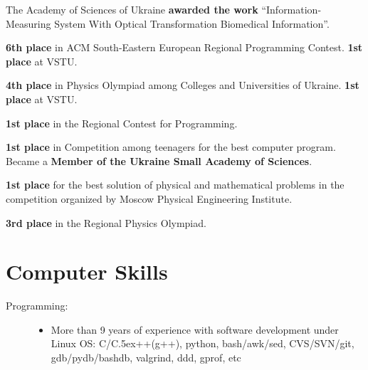 \documentclass[12pt,overlapped,line]{res}
\def\Cplusplus{{\rm C\raise.5ex\hbox{\small ++}}}
\newcommand{\mplace}[1]{\textbf{#1}}
\begin{document}
\begin{resume}
 \begin{position}
   The Academy of Sciences of Ukraine \mplace{awarded the work}
   ``Information-Measuring System With Optical Transformation
   Biomedical Information''.
 \end{position}

 \begin{position}
   \mplace{6th place} in ACM South-Eastern European Regional
   Programming Contest. \mplace{1st place} at VSTU.
 \end{position}

 \begin{position}
   \mplace{4th place} in Physics Olympiad among Colleges and
   Universities of Ukraine. \mplace{1st place} at VSTU.
 \end{position}

 \begin{position}
 \mplace{1st place} in the Regional Contest for Programming.
 \end{position}

 \begin{position}
   \mplace{1st place} in Competition among teenagers for the best
   computer program. Became a \mplace{Member of the Ukraine Small Academy
     of Sciences}.
 \end{position}

 \begin{position}
   \mplace{1st place} for the best solution of physical and mathematical
   problems in the competition organized by Moscow Physical Engineering Institute.
 \end{position}

 \begin{position}
   \mplace{3rd place} in the Regional Physics Olympiad.

 \end{position}

 \section{Computer Skills}
  \begin{description}

    \item[Programming:]\hspace*{\fill}
      \begin{itemize}
      \item More than 9 years of experience with software development
        under Linux OS: C/\Cplusplus(g++), python, bash/awk/sed,
        CVS/SVN/git, gdb/pydb/bashdb, valgrind, ddd, gprof, etc


\end{itemize}
\end{description}
\end{resume}
\end{document}
